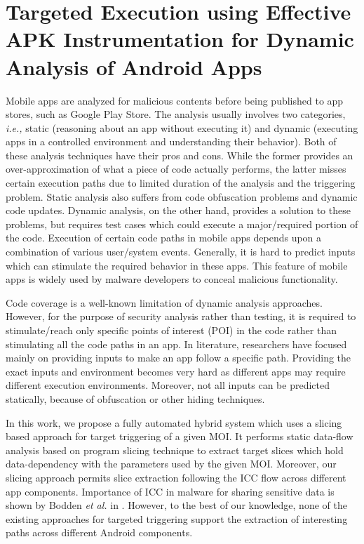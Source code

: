 \chapter{Targeted Execution using Effective APK Instrumentation for Dynamic Analysis of Android Apps}
\label{sec:teicc}

Mobile apps are analyzed for malicious contents before being published to app stores, such as Google Play Store. The analysis usually involves two categories, \textit{i.e.,} static (reasoning about an app without executing it) and dynamic (executing apps in a controlled environment and understanding their behavior). Both of these analysis techniques have their pros and cons. While the former provides an over-approximation of what a piece of code actually performs, the latter misses certain execution paths due to limited duration of the analysis and the triggering problem. Static analysis also suffers from code obfuscation problems and dynamic code updates. Dynamic analysis, on the other hand, provides a solution to these problems, but requires test cases which could execute a major/required portion of the code.
Execution of certain code paths in mobile apps depends upon a combination of various user/system events. Generally, it is hard to predict inputs which can stimulate the required behavior in these apps. This feature of mobile apps is widely used by malware developers to conceal malicious functionality. 

Code coverage is a well-known limitation of dynamic analysis approaches. However, for the purpose of security analysis rather than testing, it is required to stimulate/reach only specific points of interest (POI) in the code rather than stimulating all the code paths in an app. In literature, researchers have focused mainly on providing inputs to make an app follow a specific path. Providing the exact inputs and environment becomes very hard as different apps may require different execution environments. Moreover, not all inputs can be predicted statically, because of obfuscation or other hiding techniques.

In this work, we propose a fully automated hybrid system which uses a slicing based approach for target triggering of a given MOI. It performs static data-flow analysis \cite{allen1976program,fosdick1976data} based on program slicing technique \cite{weiser1981program} to extract target slices which hold data-dependency with the parameters used by the given MOI. Moreover, our slicing approach permits slice extraction following the ICC flow across different app components. Importance of ICC in malware for sharing sensitive data is shown by Bodden \textit{et al.} in \cite{li2015iccta}. However, to the best of our knowledge, none of the existing approaches \cite{rasthofer2016harvesting, backes2016r} for targeted triggering support the extraction of interesting paths across different Android components.  

